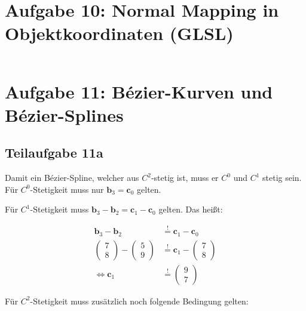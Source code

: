 \documentclass[a4paper]{scrartcl}
\begin{document}
\clearpage
\section*{Aufgabe 10: Normal Mapping in Objektkoordinaten (GLSL)}
\inputminted[linenos, numbersep=5pt, tabsize=4, frame=lines, label=shader.frag]{glsl}{shader.frag}

\clearpage
\section*{Aufgabe 11: Bézier-Kurven und Bézier-Splines}
\subsection*{Teilaufgabe 11a}
Damit ein Bézier-Spline, welcher aus $C^2$-stetig ist, muss er $C^0$ und $C^1$ stetig sein.
Für $C^0$-Stetigkeit muss nur $\mathbf{b}_3 = \mathbf{c}_0$ gelten.

Für $C^1$-Stetigkeit muss $\mathbf{b}_3 - \mathbf{b}_2 = \mathbf{c}_1 - \mathbf{c}_0$ gelten. Das heißt:

\begin{align}
    \mathbf{b}_3 - \mathbf{b}_2 &\overset{!}{=} \mathbf{c}_1 - \mathbf{c}_0\\
    \begin{pmatrix}7\\8\end{pmatrix} - \begin{pmatrix}5\\9\end{pmatrix}
    &\overset{!}{=}
    \mathbf{c}_1 - \begin{pmatrix}7\\8\end{pmatrix}\\
    \Leftrightarrow \mathbf{c}_1 &\overset{!}{=} \begin{pmatrix}9\\7\end{pmatrix}
\end{align}

Für $C^2$-Stetigkeit muss zusätzlich noch folgende Bedingung gelten:
\end{document}
